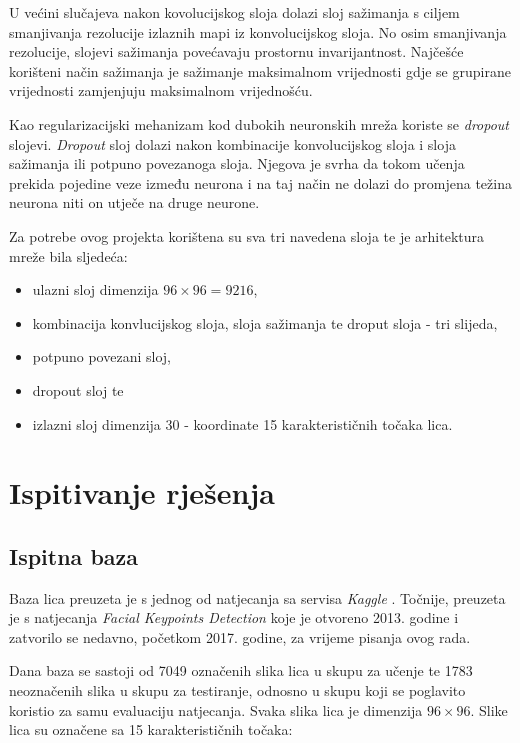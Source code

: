 \documentclass[times, utf8, zavrsni, numeric]{fer}
\begin{document}
U većini slučajeva nakon kovolucijskog sloja dolazi sloj sažimanja s ciljem smanjivanja rezolucije izlaznih mapi iz konvolucijskog sloja. No osim smanjivanja rezolucije, slojevi sažimanja povećavaju prostornu invarijantnost. Najčešće korišteni način sažimanja je sažimanje maksimalnom vrijednosti gdje se grupirane vrijednosti zamjenjuju maksimalnom vrijednošću.

Kao regularizacijski mehanizam kod dubokih neuronskih mreža koriste se \emph{dropout} slojevi. \emph{Dropout} sloj dolazi nakon kombinacije konvolucijskog sloja i sloja sažimanja ili potpuno povezanoga sloja. Njegova je svrha da tokom učenja prekida pojedine veze između neurona i na taj način ne dolazi do promjena težina neurona niti on utječe na druge neurone.

Za potrebe ovog projekta korištena su sva tri navedena sloja te je arhitektura mreže bila sljedeća:

\begin{itemize}
    \item ulazni sloj dimenzija $96 \times 96 = 9216$, 
    \item kombinacija konvlucijskog sloja, sloja sažimanja te droput sloja - tri slijeda,
    \item potpuno povezani sloj,
    \item dropout sloj te
    \item izlazni sloj dimenzija $30$ - koordinate 15 karakterističnih točaka lica.
\end{itemize}

\chapter{Ispitivanje rješenja}

\section{Ispitna baza}

Baza lica preuzeta je s jednog od natjecanja sa servisa \emph{Kaggle} \citep{kaggle}. Točnije, preuzeta je s natjecanja \emph{Facial Keypoints Detection} koje je otvoreno 2013. godine i zatvorilo se nedavno, početkom 2017. godine, za vrijeme pisanja ovog rada.

Dana baza se sastoji od 7049 označenih slika lica u skupu za učenje te 1783 neoznačenih slika u skupu za testiranje, odnosno u skupu koji se poglavito koristio za samu evaluaciju natjecanja. Svaka slika lica je dimenzija $96 \times 96$. Slike lica su označene sa 15 karakterističnih točaka:
\end{document}
